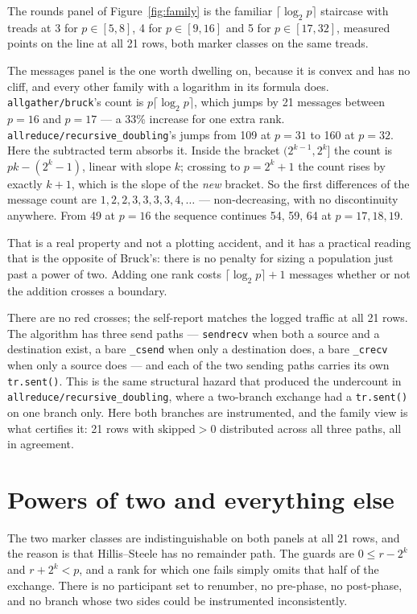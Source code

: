 \documentclass[11pt]{article}
\begin{document}
The rounds panel of Figure~\ref{fig:family} is the familiar $\lceil\log_2 p\rceil$ staircase with
treads at 3 for $p \in [5,8]$, 4 for $p \in [9,16]$ and 5 for $p \in [17,32]$, measured points on
the line at all 21 rows, both marker classes on the same treads.

The messages panel is the one worth dwelling on, because it is convex and has no cliff, and every
other family with a logarithm in its formula does. \texttt{allgather/bruck}'s count is
$p\lceil\log_2 p\rceil$, which jumps by 21 messages between $p=16$ and $p=17$ --- a 33\% increase
for one extra rank. \texttt{allreduce/recursive\_doubling}'s jumps from 109 at $p=31$ to 160 at
$p=32$. Here the subtracted term absorbs it. Inside the bracket $(2^{k-1}, 2^k]$ the count is
$pk - (2^k - 1)$, linear with slope $k$; crossing to $p = 2^k + 1$ the count rises by exactly
$k+1$, which is the slope of the \emph{new} bracket. So the first differences of the message count
are $1, 2, 2, 3, 3, 3, 3, 4, \ldots$ --- non-decreasing, with no discontinuity anywhere. From 49 at
$p=16$ the sequence continues 54, 59, 64 at $p = 17, 18, 19$.

That is a real property and not a plotting accident, and it has a practical reading that is the
opposite of Bruck's: there is no penalty for sizing a population just past a power of two. Adding
one rank costs $\lceil\log_2 p\rceil + 1$ messages whether or not the addition crosses a boundary.

There are no red crosses; the self-report matches the logged traffic at all 21 rows. The
algorithm has three send paths --- \texttt{sendrecv} when both a source and a destination exist, a
bare \texttt{\_csend} when only a destination does, a bare \texttt{\_crecv} when only a source does
--- and each of the two sending paths carries its own \texttt{tr.sent()}. This is the same
structural hazard that produced the undercount in \texttt{allreduce/recursive\_doubling}, where a
two-branch exchange had a \texttt{tr.sent()} on one branch only. Here both branches are
instrumented, and the family view is what certifies it: 21 rows with $\mathrm{skipped} > 0$
distributed across all three paths, all in agreement.

\section{Powers of two and everything else}

The two marker classes are indistinguishable on both panels at all 21 rows, and the reason is
that Hillis--Steele has no remainder path. The guards are $0 \le r - 2^k$ and $r + 2^k < p$, and a
rank for which one fails simply omits that half of the exchange. There is no participant set to
renumber, no pre-phase, no post-phase, and no branch whose two sides could be instrumented
inconsistently.
\end{document}
